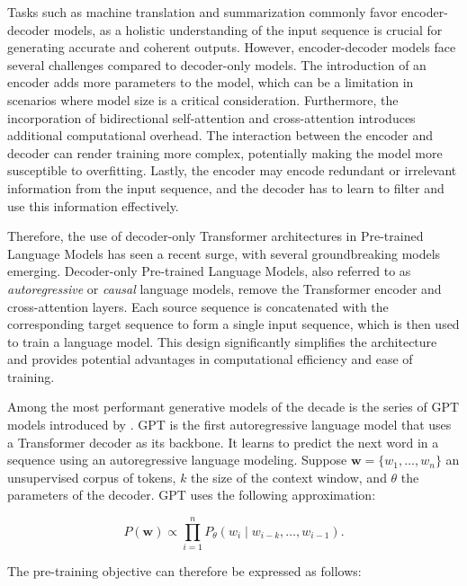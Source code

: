 Tasks such as machine translation and summarization commonly favor encoder-decoder models, as  a holistic understanding of the input sequence is crucial for generating accurate and coherent outputs. However, encoder-decoder models face several challenges compared to decoder-only models. The introduction of an encoder adds more parameters to the model, which can be a limitation in scenarios where model size is a critical consideration. Furthermore, the incorporation of bidirectional self-attention and cross-attention introduces additional computational overhead. The interaction between the encoder and decoder can render training more complex, potentially making the model more susceptible to overfitting. Lastly, the encoder may encode redundant or irrelevant information from the input sequence, and the decoder has to learn to filter and use this information effectively. 

Therefore, the use of decoder-only Transformer architectures in Pre-trained Language Models has seen a recent surge, with several groundbreaking models \citep{radford2018improving, brown2020language, ouyang2022training, touvron2023llama} emerging. Decoder-only Pre-trained Language Models, also referred to as \textit{autoregressive} or \textit{causal} language models, remove the Transformer encoder and cross-attention layers. Each source sequence is concatenated with the corresponding target sequence to form a single input sequence, which is then used to train a language model. This design significantly simplifies the architecture and provides potential advantages in computational efficiency and ease of training. 

Among the most performant generative models of the decade is the series of \ac{GPT} models introduced by \citep{radford2018improving}. \ac{GPT} is the first autoregressive language model that uses a Transformer decoder as its backbone. It learns to predict the next word in a sequence using an autoregressive language modeling. Suppose $\bm{w} = \{w_1, \ldots, w_n\}$ an unsupervised corpus of tokens, $k$ the size of the context window, and $\theta$ the parameters of the decoder. 
\ac{GPT} uses the following approximation:

\begin{equation}
    P(\bm{w}) \propto \prod_{i=1}^n P_{\theta}(w_i \mid w_{i-k}, \ldots, w_{i-1}).
\end{equation}

\noindent The pre-training objective can therefore be expressed as follows:

